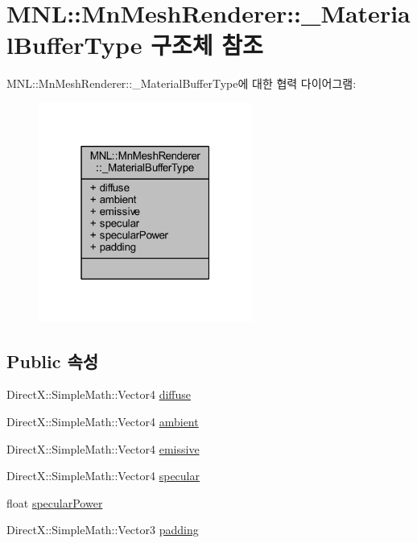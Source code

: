\hypertarget{struct_m_n_l_1_1_mn_mesh_renderer_1_1___material_buffer_type}{}\section{M\+NL\+:\+:Mn\+Mesh\+Renderer\+:\+:\+\_\+\+Material\+Buffer\+Type 구조체 참조}
\label{struct_m_n_l_1_1_mn_mesh_renderer_1_1___material_buffer_type}


M\+NL\+:\+:Mn\+Mesh\+Renderer\+:\+:\+\_\+\+Material\+Buffer\+Type에 대한 협력 다이어그램\+:\nopagebreak
\begin{figure}[H]
\begin{center}
\leavevmode
\includegraphics[width=199pt]{struct_m_n_l_1_1_mn_mesh_renderer_1_1___material_buffer_type__coll__graph}
\end{center}
\end{figure}
\subsection*{Public 속성}
\begin{DoxyCompactItemize}
\item 
Direct\+X\+::\+Simple\+Math\+::\+Vector4 \hyperlink{struct_m_n_l_1_1_mn_mesh_renderer_1_1___material_buffer_type_a7ff9130e983158bd74e7a5fb29d24b3e}{diffuse}
\item 
Direct\+X\+::\+Simple\+Math\+::\+Vector4 \hyperlink{struct_m_n_l_1_1_mn_mesh_renderer_1_1___material_buffer_type_aee327bbcf5e0c85bad6bc3a374f3a98c}{ambient}
\item 
Direct\+X\+::\+Simple\+Math\+::\+Vector4 \hyperlink{struct_m_n_l_1_1_mn_mesh_renderer_1_1___material_buffer_type_a5d2d43bd56e7d8aea2456632386fc8d4}{emissive}
\item 
Direct\+X\+::\+Simple\+Math\+::\+Vector4 \hyperlink{struct_m_n_l_1_1_mn_mesh_renderer_1_1___material_buffer_type_a7ae76ae36b475d3ef989862a8a9bc37a}{specular}
\item 
float \hyperlink{struct_m_n_l_1_1_mn_mesh_renderer_1_1___material_buffer_type_a6c5c3373b1f35531a3f0d7fd6afc819e}{specular\+Power}
\item 
Direct\+X\+::\+Simple\+Math\+::\+Vector3 \hyperlink{struct_m_n_l_1_1_mn_mesh_renderer_1_1___material_buffer_type_a9ca8141e828bb09ea15d1bd486535f41}{padding}
\end{DoxyCompactItemize}


